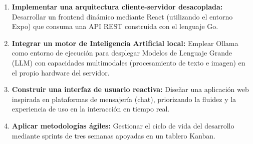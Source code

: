 \begin{enumerate}
    \item \textbf{Implementar una arquitectura cliente-servidor desacoplada:} Desarrollar un frontend dinámico mediante React (utilizando el entorno Expo) que consuma una API REST construida con el lenguaje Go.
    \item \textbf{Integrar un motor de Inteligencia Artificial local:} Emplear Ollama como entorno de ejecución para desplegar Modelos de Lenguaje Grande (LLM) con capacidades multimodales (procesamiento de texto e imagen) en el propio hardware del servidor.
    \item \textbf{Construir una interfaz de usuario reactiva:} Diseñar una aplicación web inspirada en plataformas de mensajería (chat), priorizando la fluidez y la experiencia de uso en la interacción en tiempo real.
    \item \textbf{Aplicar metodologías ágiles:} Gestionar el ciclo de vida del desarrollo mediante sprints de tres semanas apoyadas en un tablero Kanban.
\end{enumerate}